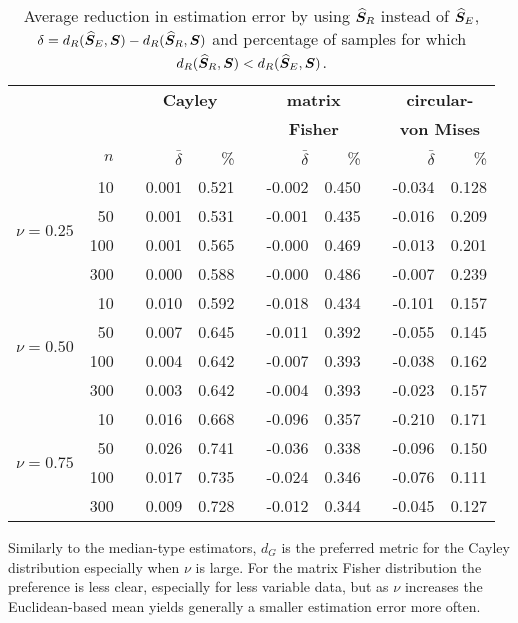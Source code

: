\begin{table}[h]
\caption{Average reduction in estimation error by using ${\widehat{\bm S}_R}$ instead of ${\widehat{\bm S}_E}$, $\delta={d_R}({\widehat{\bm S}_E},\bm S) - {d_R}({\widehat{\bm S}_R},\bm S)$ and percentage of samples for which ${d_R}({\widehat{\bm S}_R},\bm S) < {d_R}({\widehat{\bm S}_E},\bm S)$.  \label{tab:percL2}}
\begin{center}
\begin{tabular}{rrcrrcrrcrr}
  \hline
  & &&\multicolumn{2}{c}{\textbf{Cayley}} & &\multicolumn{2}{c}{\textbf{matrix} } &&\multicolumn{2}{c}{\textbf{circular-}}\\
    && &\multicolumn{2}{c}{} & &\multicolumn{2}{c}{\textbf{Fisher}} & &\multicolumn{2}{c}{\textbf{von Mises}}\\ 
\rule[2mm]{0mm}{3mm} 
  &  $n$ && $\bar{\delta}$ & \% & & $\bar{\delta}$ & \% & & $\bar{\delta}$ & \% \\ 
  \hline \hline
\multirow{4}{*}{$\nu=0.25$}
  &   10 &&  0.001 & 0.521 &&  -0.002 & 0.450 && -0.034 & 0.128 \\  
  &   50 && 0.001 & 0.531 &&  -0.001 & 0.435 && -0.016 & 0.209 \\\ 
  &  100 && 0.001 & 0.565 &&  -0.000 & 0.469 && -0.013 & 0.201 \\
  &  300 && 0.000 & 0.588 &&  -0.000 & 0.486 &&  -0.007 & 0.239 \\ \hline
  \multirow{4}{*}{$\nu=0.50$}
   &   10 &&   0.010 & 0.592 &&  -0.018 & 0.434 &&  -0.101 & 0.157 \\ 
   &   50 &&  0.007 & 0.645 &&  -0.011 & 0.392 &&  -0.055 & 0.145 \\ 
   &  100 &&   0.004 & 0.642 &&  -0.007 & 0.393 &&  -0.038 & 0.162 \\ 
   &  300 &&   0.003 & 0.642 &&  -0.004 & 0.393 &&  -0.023 & 0.157 \\ \hline
  \multirow{4}{*}{$\nu=0.75$}
   &   10 &&   0.016 & 0.668 &&  -0.096 & 0.357 &&  -0.210 & 0.171 \\ 
   &   50 &&  0.026 & 0.741 &&  -0.036 & 0.338 &&  -0.096 & 0.150 \\
   &  100 &&  0.017 & 0.735 &&  -0.024 & 0.346 &&  -0.076 & 0.111 \\ 
   &  300 &&  0.009 & 0.728 &&  -0.012 & 0.344 && -0.045 & 0.127 \\ 
   \hline
\end{tabular}
\end{center}
\end{table}

Similarly to the median-type estimators, $d_{G}$ is the preferred metric for the Cayley distribution especially when $\nu$ is large.  For the  matrix Fisher distribution the preference is less clear, especially for less variable data, but as $\nu$ increases the Euclidean-based mean yields generally a smaller estimation error more often. \\
 
